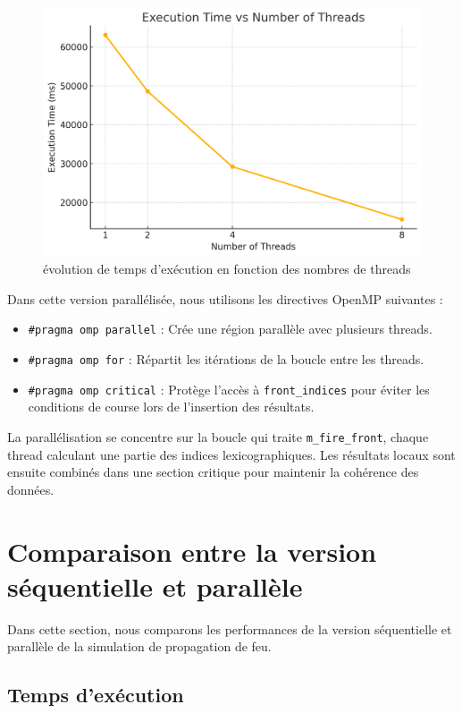 \documentclass[a4paper,12pt]{article}
\begin{document}
\begin{figure}[H]
    \centering
    \includegraphics[width=1\linewidth]{imgs/chart_1.png}
    \caption{évolution de temps d'exécution en fonction des nombres de threads}
    \label{fig:enter-label}
\end{figure}
Dans cette version parallélisée, nous utilisons les directives OpenMP suivantes :
\begin{itemize}
    \item \texttt{\#pragma omp parallel} : Crée une région parallèle avec plusieurs threads.
    \item \texttt{\#pragma omp for} : Répartit les itérations de la boucle entre les threads.
    \item \texttt{\#pragma omp critical} : Protège l'accès à \texttt{front\_indices} pour éviter les conditions de course lors de l'insertion des résultats.

\end{itemize}

La parallélisation se concentre sur la boucle qui traite \texttt{m\_fire\_front}, chaque thread calculant une partie des indices lexicographiques. Les résultats locaux sont ensuite combinés dans une section critique pour maintenir la cohérence des données.
\section{Comparaison entre la version séquentielle et parallèle}

Dans cette section, nous comparons les performances de la version séquentielle et parallèle de la simulation de propagation de feu. 

\subsection{Temps d'exécution}
\end{document}
